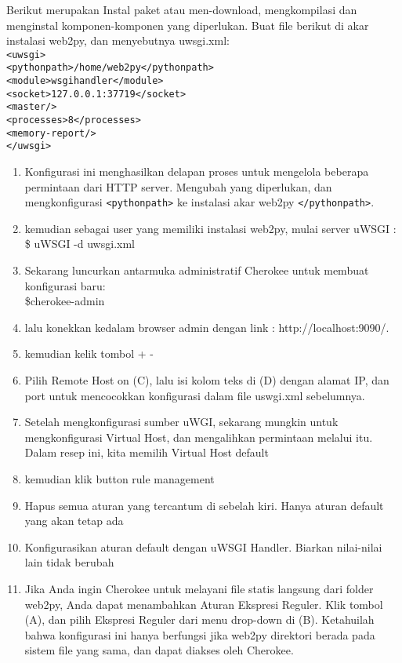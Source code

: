 \documentclass[12pt, times new roman, a4paper]{Article}
\begin{document}
	 Berikut merupakan Instal paket atau men-download, mengkompilasi dan menginstal komponen-komponen yang diperlukan.
Buat file berikut di akar instalasi web2py, dan menyebutnya uwsgi.xml:\\
\verb|<uwsgi>| 
\\ \verb|<pythonpath>/home/web2py</pythonpath>|
\\ \verb|<module>wsgihandler</module>|
\\ \verb|<socket>127.0.0.1:37719</socket>|
\\ \verb|<master/>|
\\ \verb|<processes>8</processes>|
\\ \verb|<memory-report/>|
\\ \verb|</uwsgi>|

\begin{enumerate}
\item Konfigurasi ini menghasilkan delapan proses untuk mengelola beberapa permintaan dari
HTTP server. Mengubah yang diperlukan, dan mengkonfigurasi \verb|<pythonpath>| ke instalasi
akar web2py \verb|</pythonpath>|.
\item kemudian sebagai user yang memiliki instalasi web2py, mulai server uWSGI :\\ \$ uWSGI -d uwsgi.xml
\item Sekarang luncurkan antarmuka administratif Cherokee untuk membuat konfigurasi baru:\\ \$cherokee-admin
\item lalu konekkan kedalam browser admin dengan link : http://localhost:9090/.
\item kemudian kelik tombol + -
\item Pilih Remote Host on (C), lalu isi kolom teks di (D) dengan alamat IP, dan port untuk mencocokkan konfigurasi dalam file uswgi.xml sebelumnya.
\item Setelah mengkonfigurasi sumber uWGI, sekarang mungkin untuk mengkonfigurasi Virtual Host, dan
mengalihkan permintaan melalui itu. Dalam resep ini, kita memilih Virtual Host default
\item kemudian klik button rule management
\item Hapus semua aturan yang tercantum di sebelah kiri. Hanya aturan default yang akan tetap ada
\item Konfigurasikan aturan default dengan uWSGI Handler. Biarkan nilai-nilai lain tidak berubah
\item Jika Anda ingin Cherokee untuk melayani file statis langsung dari folder web2py, Anda dapat menambahkan Aturan Ekspresi Reguler. Klik tombol (A), dan pilih Ekspresi Reguler dari menu drop-down di (B). Ketahuilah bahwa konfigurasi ini hanya berfungsi jika web2py direktori berada pada sistem file yang sama, dan dapat diakses oleh Cherokee.

\end{enumerate}
\end{document}
